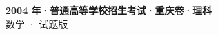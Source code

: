 \documentclass[zihao=-4, a4paper]{ctexart}
\begin{document}
\begin{center}
  {\Large\bfseries 2004 年·普通高等学校招生考试·重庆卷·理科}\\[4pt]
  {\large 数学 · 试题版}
\end{center}
\medskip
{}

\end{document}
